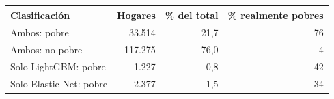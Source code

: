 \begin{tabular}{lrrr}
\toprule
\textbf{Clasificación} & \textbf{Hogares} & \textbf{\% del total} & \textbf{\% realmente pobres} \\
\midrule
Ambos: pobre & 33.514 & 21,7 & 76 \\
Ambos: no pobre & 117.275 & 76,0 & 4 \\
Solo LightGBM: pobre & 1.227 & 0,8 & 42 \\
Solo Elastic Net: pobre & 2.377 & 1,5 & 34 \\
\bottomrule
\end{tabular}
